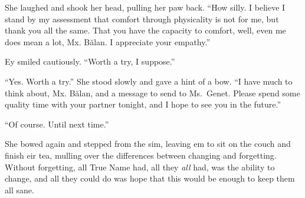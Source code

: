 She laughed and shook her head, pulling her paw back. ``How silly. I believe I stand by my assessment that comfort through physicality is not for me, but thank you all the same. That you have the capacity to comfort, well, even me does mean a lot, Mx. Bălan. I appreciate your empathy.''

Ey smiled cautiously. ``Worth a try, I suppose.''

``Yes. Worth a try.'' She stood slowly and gave a hint of a bow. ``I have much to think about, Mx. Bălan, and a message to send to Ms.~Genet. Please spend some quality time with your partner tonight, and I hope to see you in the future.''

``Of course. Until next time.''

She bowed again and stepped from the sim, leaving em to sit on the couch and finish eir tea, mulling over the differences between changing and forgetting. Without forgetting, all True Name had, all they \emph{all} had, was the ability to change, and all they could do was hope that this would be enough to keep them all sane.
